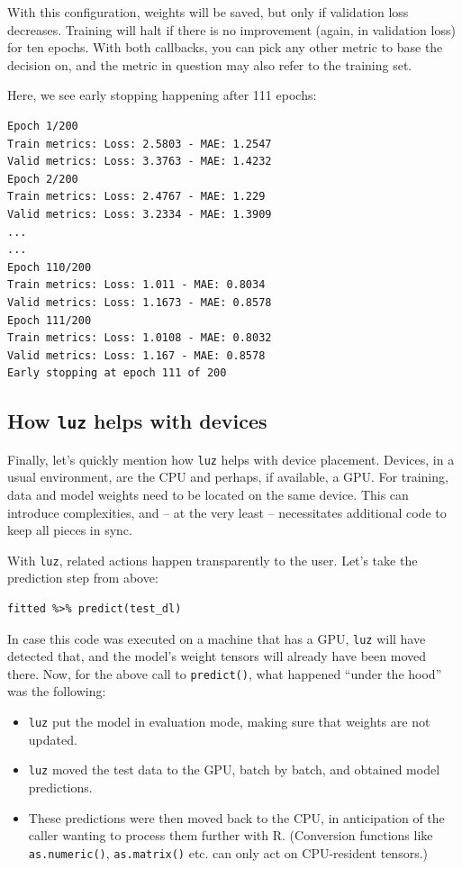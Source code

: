 \documentclass[
  letterpaper,
]{krantz}
\providecommand{\tightlist}{%
  \setlength{\itemsep}{0pt}\setlength{\parskip}{0pt}}\usepackage{longtable,booktabs,array}
\begin{document}
With this configuration, weights will be saved, but only if validation
loss decreases. Training will halt if there is no improvement (again, in
validation loss) for ten epochs. With both callbacks, you can pick any
other metric to base the decision on, and the metric in question may
also refer to the training set.

Here, we see early stopping happening after 111 epochs:

\begin{verbatim}
Epoch 1/200
Train metrics: Loss: 2.5803 - MAE: 1.2547
Valid metrics: Loss: 3.3763 - MAE: 1.4232
Epoch 2/200
Train metrics: Loss: 2.4767 - MAE: 1.229
Valid metrics: Loss: 3.2334 - MAE: 1.3909
...
...
Epoch 110/200
Train metrics: Loss: 1.011 - MAE: 0.8034
Valid metrics: Loss: 1.1673 - MAE: 0.8578
Epoch 111/200
Train metrics: Loss: 1.0108 - MAE: 0.8032
Valid metrics: Loss: 1.167 - MAE: 0.8578
Early stopping at epoch 111 of 200
\end{verbatim}

\hypertarget{how-luz-helps-with-devices}{%
\subsection{\texorpdfstring{How \texttt{luz} helps with
devices}{How luz helps with devices}}\label{how-luz-helps-with-devices}}

Finally, let's quickly mention how \texttt{luz} helps with device
placement. Devices, in a usual environment, are the CPU and perhaps, if
available, a GPU. For training, data and model weights need to be
located on the same device. This can introduce complexities, and -- at
the very least -- necessitates additional code to keep all pieces in
sync.

With \texttt{luz}, related actions happen transparently to the user.
Let's take the prediction step from above:

\begin{verbatim}
fitted %>% predict(test_dl)
\end{verbatim}

In case this code was executed on a machine that has a GPU, \texttt{luz}
will have detected that, and the model's weight tensors will already
have been moved there. Now, for the above call to \texttt{predict()},
what happened ``under the hood'' was the following:

\begin{itemize}
\tightlist
\item
  \texttt{luz} put the model in evaluation mode, making sure that
  weights are not updated.
\item
  \texttt{luz} moved the test data to the GPU, batch by batch, and
  obtained model predictions.
\item
  These predictions were then moved back to the CPU, in anticipation of
  the caller wanting to process them further with R. (Conversion
  functions like \texttt{as.numeric()}, \texttt{as.matrix()} etc. can
  only act on CPU-resident tensors.)
\end{itemize}
\end{document}
